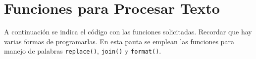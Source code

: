 \section{Funciones para Procesar Texto}

  A continuación se indica el código con las funciones
  solicitadas.
  Recordar que hay varias formas de programarlas.
  En esta pauta se emplean las funciones para manejo de palabras
  \texttt{replace()},
  \texttt{join()} y
  \texttt{format()}.
  
    
    
\pagebreak[4]